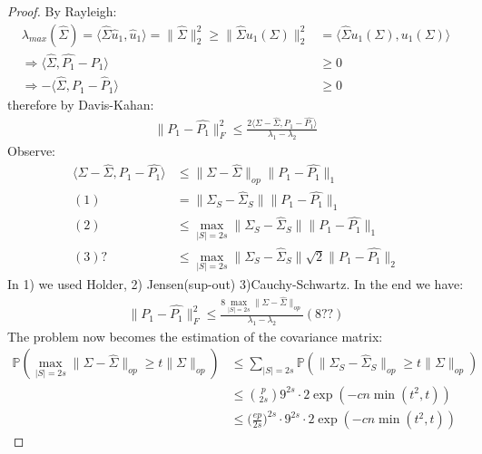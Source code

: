 \begin{proof}
	By Rayleigh:
	\begin{align*}
		\lambda_{max}(\hat{\Sigma}) =  \langle \hat{\Sigma}\hat{u}_1, \hat{u}_1\rangle = \|\hat{\Sigma}\|_2^2 \ge \|\hat{\Sigma}u_1(\Sigma)\|_2^2 &= \langle \hat{\Sigma}u_1(\Sigma), u_1(\Sigma)\rangle \\
		\Rightarrow \langle\hat{\Sigma}, \hat{P_1}- P_1\rangle &\ge 0 \\
		\Rightarrow - \langle\hat{\Sigma}, P_1 - \hat{P}_1\rangle &\ge 0
	\end{align*}
	therefore by Davis-Kahan:
	\begin{align*}
		\|P_1 - \hat{P_1}\|_F^2 \le \frac{2\langle \Sigma - \hat{\Sigma}, P_1 - \hat{P_1}\rangle}{\lambda_1 - \lambda_2}
	\end{align*}
	Observe:
	\begin{align*}
		\langle \Sigma - \hat{\Sigma}, P_1 -\hat{P_1}\rangle &\le \|\Sigma - \hat{\Sigma}\|_{op} \|P_1 - \hat{P_1}\|_1\\
		(1)&= \|\Sigma_S - \hat{\Sigma}_S\|\|P_1 - \hat{P_1}\|_1\\
		(2)&\le  \max_{|S| = 2s}\|\Sigma_S - \hat{\Sigma}_S\|\|P_1 - \hat{P_1}\|_1\\
		(3)?&\le \max_{|S| = 2s}\|\Sigma_S - \hat{\Sigma}_S\|\sqrt{2}\|P_1 - \hat{P_1}\|_2
	\end{align*}
	In 1) we used Holder, 2) Jensen(sup-out) 3)Cauchy-Schwartz. In the end we have:
	\begin{align*}
		\|P_1 - \hat{P_1}\|_F^2 \le \frac{8\max_{|S| = 2s}\|\Sigma - \hat{\Sigma}\|_{op} }{\lambda_1 - \lambda_2} (8??)
	\end{align*}
	The problem now becomes the estimation of the covariance matrix:
	\begin{align*}
		\mathbb{P}(\max_{|S| = 2s}\|\Sigma - \hat{\Sigma}\|_{op} \ge t\|\Sigma\|_{op}) &\le \sum_{|S| = 2s}\mathbb{P}(\|\Sigma_S - \hat{\Sigma}_S\|_{op} \ge t \|\Sigma\|_{op})\\
		&\le \binom{p}{2s} 9^{2s} \cdot 2\exp(-cn\min(t^2,t))\\
		&\le \bigg(\frac{ep}{2s})^{2s} \cdot  9^{2s} \cdot 2\exp(-cn\min(t^2,t))
	\end{align*}
\end{proof}



